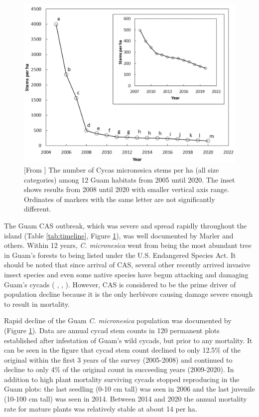 \documentclass[12pt,letterpaper,english,bibliography=totocnumbered, abstract=on]{scrartcl}
\begin{document}
\begin{figure}[p]
	\centering
	\includegraphics[width=\linewidth]{marler-stem-count}
	
	\caption{[From \cite{marlerLongitudeForestFragmentation2020}] The number
		of Cycas micronesica stems per ha (all size categories) among 12 Guam habitats
		from 2005 until 2020. The inset shows results from 2008 until 2020 with smaller vertical axis range. Ordinates of markers with the same letter are not significantly different.}
	
	\label{fig:marler-stem-count}
\end{figure}


The Guam CAS outbreak, which was severe and spread rapidly throughout the island (Table \ref{tab:timeline}, Figure \ref{fig:marler-stem-count}), was well documented by Marler and others. Within 12 years, \textit{C. micronesica} went from being the most abundant tree in Guam's forests to being listed under the U.S. Endangered Species Act. It should be noted that since arrival of CAS, several other recently arrived invasive insect species and even some native species have begun attacking and damaging Guam's cycads (
\cite{marlerPestsCycasMicronesica2006}, \cite{mooreCoalitionInvasiveSpecies2013}, \parencite{delosoBioticThreatsCycas2020a}). 
However, CAS is considered to be the prime driver of population decline because it is the only herbivore causing damage severe enough to result in mortality.

Rapid decline of the Guam \textit{C. micronesica} population was documented by 
\cite{marlerLongitudeForestFragmentation2020} (Figure \ref{fig:marler-stem-count}). Data are annual cycad stem counts in 120 permanent plots established after infestation of Guam's wild cycads, but prior to any mortality. It can be seen in the figure that cycad stem count declined to only 12.5\% of the original within the first 3 years of the survey (2005-2008) and continued to decline to only 4\% of the original count in succeeding years (2009-2020). In addition to high plant mortality surviving cycads stopped reproducing in the Guam plots: the last seedling (0-10 cm tall) was seen in 2006 and the last juvenile (10-100 cm tall) was seen in 2014. Between 2014 and 2020 the annual mortality rate for mature plants was relatively stable at about 14 per ha.
\end{document}
